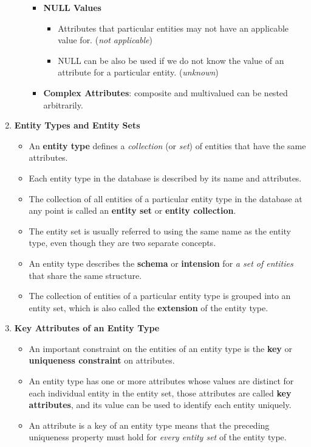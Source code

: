 \documentclass[10pt]{article}
\newcommand{\tf}{\textbf}
\newcommand{\ti}{\textit}
\begin{document}
\begin{enumerate}
\begin{itemize}
\begin{itemize}
			\item \tf{NULL Values}
			\begin{itemize}
				\item Attributes that particular entities may not have an applicable value for. (\ti{not applicable})
				\item NULL can be also be used if we do not know the value of an attribute for a particular entity. (\ti{unknown}) 
			\end{itemize}

			\item \tf{Complex Attributes}: composite and multivalued can be nested arbitrarily.
		\end{itemize}
	\end{itemize}
	\item \tf{Entity Types and Entity Sets}
	\begin{itemize}
		\item An \tf{entity type} defines a \ti{collection} (or \ti{set}) of entities that have the same attributes.
		\item Each entity type in the database is described by its name and attributes.
		\item The collection of all entities of a particular entity type in the database at any point is called an \tf{entity set} or \tf{entity collection}.
		\item The entity set is usually referred to using the same name as the entity type, even though they are two separate concepts.
		\item An entity type describes the \tf{schema} or \tf{intension} for \ti{a set of entities} that share the same structure.
		\item The collection of entities of a particular entity type is grouped into an entity set, which is also called the \tf{extension} of the entity type.
	\end{itemize}

	\item \tf{Key Attributes of an Entity Type}
	\begin{itemize}
		\item An important constraint on the entities of an entity type is the \tf{key} or \tf{uniqueness constraint} on attributes.
		\item An entity type has one or more attributes whose values are distinct for each individual entity in the entity set, those attributes are called \tf{key attributes}, and its value can be used to identify each entity uniquely.
		\item An attribute is a key of an entity type means that the preceding uniqueness property must hold for \ti{every entity set} of the entity type.   
	\end{itemize}


\end{enumerate}
\end{document}
